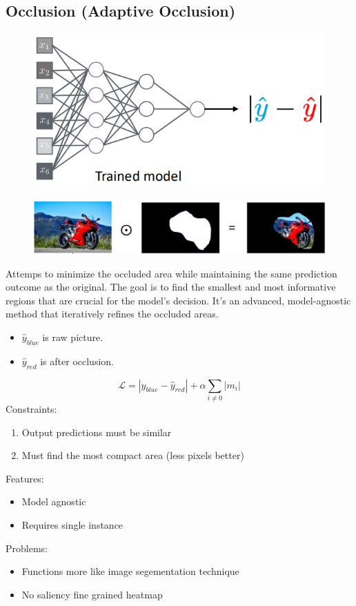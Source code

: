 \subsection{Occlusion (Adaptive Occlusion)}
\begin{figure}[!h]
    \includegraphics[width = 0.7 \columnwidth]{figures/XAI2/AdaptiveOcclusionNetwork.png}
\end{figure}
\begin{figure}[!h]
    \includegraphics[width =  \columnwidth]{figures/XAI2/AdaptiveOcclusionPictures.png}
\end{figure}

Attemps to minimize the occluded area while maintaining the same prediction outcome as the original.
The goal is to find the smallest and most informative regions that are crucial for the model's decision.
It's an advanced, model-agnostic method that iteratively refines the occluded areas.
\begin{itemize}
    \item \(\hat{y}_{blue}\) is raw picture.
    \item \(\hat{y}_{red}\) is after occlusion.
\end{itemize}
\[
\mathcal{L} = |\hat{y}_{blue}-\hat{y}_{red}| + \alpha \sum_{i \neq 0}|m_i|
\]
Constraints:
\begin{enumerate}
    \item Output predictions must be similar
    \item Must find the most compact area (less pixels better)
\end{enumerate}
Features:
\begin{itemize}
    \item Model agnostic
    \item Requires single instance
\end{itemize}
Problems:
\begin{itemize}
    \item Functions more like image segementation technique
    \item No saliency fine grained heatmap
\end{itemize}



